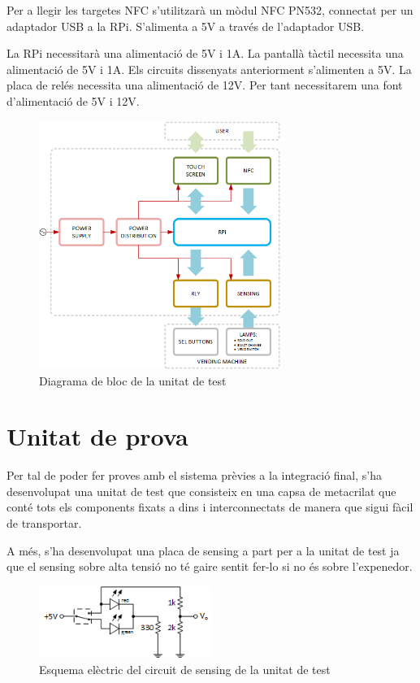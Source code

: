 Per a llegir les targetes NFC s'utilitzarà un mòdul NFC PN532, connectat per un adaptador USB a la RPi. S'alimenta a 5V a través de l'adaptador USB.

La RPi necessitarà una alimentació de 5V i 1A.
La pantallà tàctil necessita una alimentació de 5V i 1A.
Els circuits dissenyats anteriorment s'alimenten a 5V.
La placa de relés necessita una alimentació de 12V. Per tant necessitarem una font d'alimentació de 5V i 12V.

\begin{figure}[H]
\center
\includegraphics[width=0.7\textwidth]{images/block_diagram}
\caption{Diagrama de bloc de la unitat de test}
\label{fig:block_diagram}
\end{figure}

\section{Unitat de prova}
Per tal de poder fer proves amb el sistema prèvies a la integració final, s'ha desenvolupat una unitat de test que consisteix en una capsa de metacrilat que conté tots els components fixats a dins i interconnectats de manera que sigui fàcil de transportar.

A més, s'ha desenvolupat una placa de sensing a part per a la unitat de test ja que el sensing sobre alta tensió no té gaire sentit fer-lo si no és sobre l'expenedor.

\begin{figure}[H]
\center
\includegraphics[width=0.5\textwidth]{images/sensing_demonstrator}
\caption{Esquema elèctric del circuit de sensing de la unitat de test}
\label{fig:sensing_demonstrator_board}
\end{figure}

